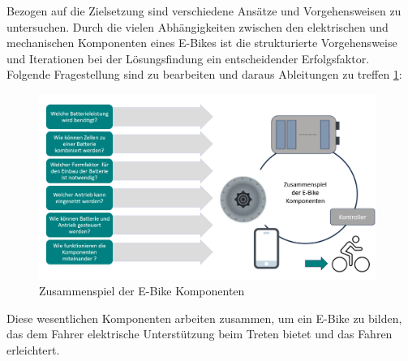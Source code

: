 Bezogen auf die Zielsetzung sind verschiedene Ansätze und Vorgehensweisen zu untersuchen. Durch die vielen Abhängigkeiten zwischen den elektrischen und mechanischen Komponenten eines E-Bikes ist die strukturierte Vorgehensweise und Iterationen bei der Lösungsfindung ein entscheidender Erfolgsfaktor. Folgende Fragestellung sind zu bearbeiten und daraus Ableitungen zu treffen \ref{fig:Komponenten}:    


\begin{figure}[h]
    \centering
    \includegraphics[width=11cm]{images/Flussdiagramm_E-bike.png}
    \caption{Zusammenspiel der E-Bike Komponenten}
    \label{fig:Komponenten}
\end{figure}


Diese wesentlichen Komponenten arbeiten zusammen, um ein E-Bike zu bilden, das dem Fahrer elektrische Unterstützung beim Treten bietet und das Fahren erleichtert.